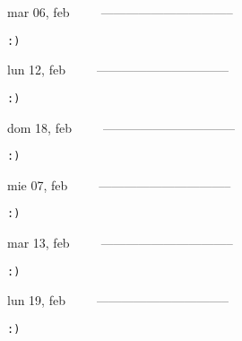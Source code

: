\documentclass[letterpaper,10pt]{article}
\begin{document}
\begin{multicols}{3}
{mar 06, feb\ \ \ \ \ --------------------------------}
\begin{flushright}\begin{small}\texttt{:)}\end{small}\end{flushright}
\vfill
{lun 12, feb\ \ \ \ \ --------------------------------}
\begin{flushright}\begin{small}\texttt{:)}\end{small}\end{flushright}\par
\vfill
{dom 18, feb\ \ \ \ \ --------------------------------}
\begin{flushright}\begin{small}\texttt{:)}\end{small}\end{flushright}\par
\vfill
\end{multicols}
\vspace{1.05cm}

\begin{multicols}{3}
{mie 07, feb\ \ \ \ \ --------------------------------}
\begin{flushright}\begin{small}\texttt{:)}\end{small}\end{flushright}
\vfill
{mar 13, feb\ \ \ \ \ --------------------------------}
\begin{flushright}\begin{small}\texttt{:)}\end{small}\end{flushright}\par
\vfill
{lun 19, feb\ \ \ \ \ --------------------------------}
\begin{flushright}\begin{small}\texttt{:)}\end{small}\end{flushright}\par
\vfill
\end{multicols}
\vspace{1.05cm}
\end{document}
